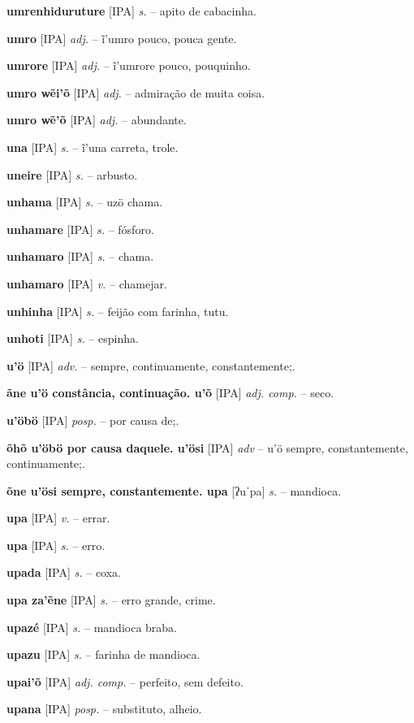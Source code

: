 \textbf{umrenhiduruture} [IPA] \textit{s.} -- apito de cabacinha.

\textbf{umro} [IPA] \textit{adj.} -- ĩ'umro pouco, pouca gente.

\textbf{umrore} [IPA] \textit{adj.} -- ĩ'umrore pouco, pouquinho.

\textbf{umro wẽi'õ} [IPA] \textit{adj.} -- admiração de muita coisa.

\textbf{umro wẽ'õ} [IPA] \textit{adj.} -- abundante.

\textbf{una} [IPA] \textit{s.} -- ĩ'una carreta, trole.

\textbf{uneire} [IPA] \textit{s.} -- arbusto.

\textbf{unhama} [IPA] \textit{s.} -- uzö chama.

\textbf{unhamare} [IPA] \textit{s.} -- fósforo.

\textbf{unhamaro} [IPA] \textit{s.} -- chama.

\textbf{unhamaro} [IPA] \textit{v.} -- chamejar.

\textbf{unhinha} [IPA] \textit{s.} -- feijão com farinha, tutu.

\textbf{unhoti} [IPA] \textit{s.} -- espinha.

\textbf{u'ö} [IPA] \textit{adv.} -- sempre, continuamente, constantemente;.

\textbf{ãne u'ö constância, continuação. u'õ} [IPA] \textit{adj. comp.} -- seco.

\textbf{u'öbö} [IPA] \textit{posp.} -- por causa de;.

\textbf{õhõ u'öbö por causa daquele. u'ösi} [IPA] \textit{adv} -- u'ö sempre, constantemente, continuamente;.

\textbf{õne u'ösi sempre, constantemente. upa} [ʔuˈpa] \textit{s.} -- mandioca.

\textbf{upa} [IPA] \textit{v.} -- errar.

\textbf{upa} [IPA] \textit{s.} -- erro.

\textbf{upada} [IPA] \textit{s.} -- coxa.

\textbf{upa za'ẽne} [IPA] \textit{s.} -- erro grande, crime.

\textbf{upazé} [IPA] \textit{s.} -- mandioca braba.

\textbf{upazu} [IPA] \textit{s.} -- farinha de mandioca.

\textbf{upai'õ} [IPA] \textit{adj. comp.} -- perfeito, sem defeito.

\textbf{upana} [IPA] \textit{posp.} -- substituto, alheio.

